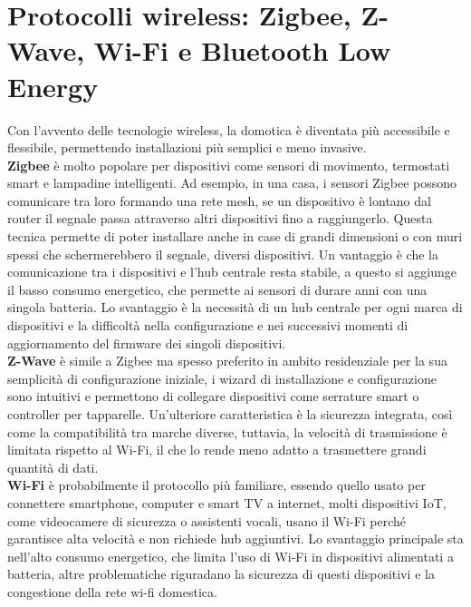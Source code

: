\section{Protocolli wireless: Zigbee, Z-Wave, Wi-Fi e Bluetooth Low Energy}
Con l’avvento delle tecnologie wireless, la domotica è diventata più accessibile e flessibile, permettendo installazioni più semplici e meno invasive.\\

\textbf{Zigbee} è molto popolare per dispositivi come sensori di movimento, termostati smart e lampadine intelligenti. Ad esempio, in una casa, i sensori Zigbee possono comunicare tra loro formando una rete mesh,  se un dispositivo è lontano dal router il segnale passa attraverso altri dispositivi fino a raggiungerlo. Questa tecnica permette di poter installare anche in case di grandi dimensioni o con muri spessi che schermerebbero il segnale, diversi dispositivi.
Un vantaggio è che la comunicazione tra i dispositivi e l'hub centrale resta stabile, a questo si aggiunge il basso consumo energetico, che permette ai sensori di durare anni con una singola batteria. 
Lo svantaggio è la necessità di un hub centrale per ogni marca di dispositivi e la difficoltà nella configurazione e nei successivi momenti di aggiornamento del firmware dei singoli dispositivi.\\

\textbf{Z-Wave} è simile a Zigbee ma spesso preferito in ambito residenziale per la sua semplicità di configurazione iniziale, i wizard di installazione e configurazione sono intuitivi e permettono di collegare dispositivi come serrature smart o controller per tapparelle. 
Un'ulteriore caratteristica è la sicurezza integrata, così come la compatibilità tra marche diverse, tuttavia, la velocità di trasmissione è limitata rispetto al Wi-Fi, il che lo rende meno adatto a trasmettere grandi quantità di dati.\\

\textbf{Wi-Fi} è probabilmente il protocollo più familiare, essendo quello usato per connettere smartphone, computer e smart TV a internet, molti dispositivi IoT, come videocamere di sicurezza o assistenti vocali, usano il Wi-Fi perché garantisce alta velocità e non richiede hub aggiuntivi. 
Lo svantaggio principale sta nell’alto consumo energetico, che limita l’uso di Wi-Fi in dispositivi alimentati a batteria, altre problematiche riguradano la sicurezza di questi dispositivi e la congestione della rete wi-fi domestica.\\

